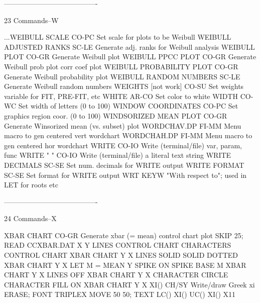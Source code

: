 ----------------------------------------
 
23
Commands--W
 
...WEIBULL SCALE            CO-PC Set scale for plots to be Weibull
WEIBULL ADJUSTED RANKS      SC-LE Generate adj. ranks for Weibull analysis
WEIBULL PLOT                CO-GR Generate Weibull plot
WEIBULL PPCC PLOT           CO-GR Generate Weibull prob plot corr coef plot
WEIBULL PROBABILITY PLOT    CO-GR Generate Weibull probability plot
WEIBULL RANDOM NUMBERS      SC-LE Generate Weibull random numbers
WEIGHTS      [not work]     CO-SU Set weights variable for FIT, PRE-FIT, etc
WHITE                       AR-CO Set color to white
WIDTH                       CO-WC Set width of letters (0 to 100)
WINDOW COORDINATES          CO-PC Set graphics region coor. (0 to 100)
WINDSORIZED MEAN PLOT       CO-GR Generate Winsorized mean (vs. subset) plot
WORDCHAV.DP                 FI-MM Menu macro to gen centered vert wordchart
WORDCHAH.DP                 FI-MM Menu macro to gen centered hor wordchart
WRITE                       CO-IO Write (terminal/file) var, param, func
WRITE "  "                  CO-IO Write (terminal/file) a literal text string
WRITE DECIMALS              SC-SE Set num. decimals for WRITE output
WRITE FORMAT                SC-SE Set format for WRITE output
WRT                         KEYW  "With respect to"; used in LET for roots etc
 
----------------------------------------
 
24
Commands--X
 
XBAR CHART                  CO-GR Generate xbar (= mean) control chart plot
                                  SKIP 25; READ CCXBAR.DAT X Y
                                  LINES CONTROL CHART
                                  CHARACTERS CONTROL CHART
                                  XBAR CHART Y X
                                  LINES SOLID SOLID DOTTED
                                  XBAR CHART Y X
                                  LET M = MEAN Y
                                  SPIKE ON
                                  SPIKE BASE M
                                  XBAR CHART Y X
                                  LINES OFF
                                  XBAR CHART Y X
                                  CHARACTER CIRCLE
                                  CHARACTER FILL ON
                                  XBAR CHART Y X
XI()                        CH/SY Write/draw Greek xi
                                  ERASE; FONT TRIPLEX
                                  MOVE 50 50; TEXT LC() XI() UC() XI()
X11
 
